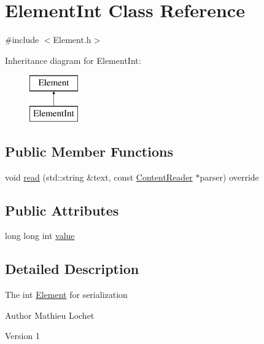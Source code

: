\hypertarget{classElementInt}{}\section{Element\+Int Class Reference}
\label{classElementInt}


{\ttfamily \#include $<$Element.\+h$>$}

Inheritance diagram for Element\+Int\+:\begin{figure}[H]
\begin{center}
\leavevmode
\includegraphics[height=2.000000cm]{classElementInt}
\end{center}
\end{figure}
\subsection*{Public Member Functions}
\begin{DoxyCompactItemize}
\item 
void \mbox{\hyperlink{classElementInt_ab5a7d87743dbdc52910c59bc4b93e6da}{read}} (std\+::string \&text, const \mbox{\hyperlink{classContentReader}{Content\+Reader}} $\ast$parser) override
\end{DoxyCompactItemize}
\subsection*{Public Attributes}
\begin{DoxyCompactItemize}
\item 
long long int \mbox{\hyperlink{classElementInt_ab43f27a056222463dc4bd246337dfa63}{value}}
\end{DoxyCompactItemize}


\subsection{Detailed Description}
The int \mbox{\hyperlink{classElement}{Element}} for serialization

\begin{DoxyAuthor}{Author}
Mathieu Lochet 
\end{DoxyAuthor}
\begin{DoxyVersion}{Version}
1 
\end{DoxyVersion}


